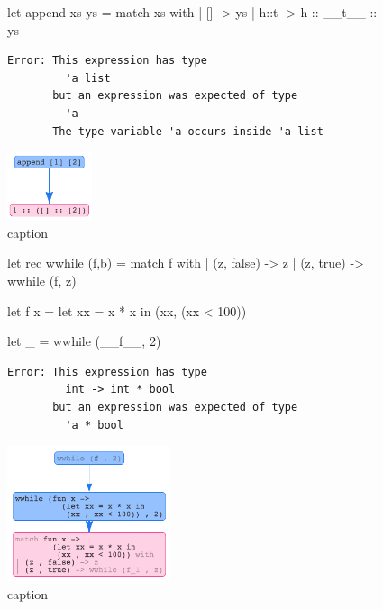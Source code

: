 \begin{figure}[ht]
\centering
\begin{minipage}{0.49\linewidth}
\centering
\begin{ecode}
let append xs ys = match xs with
  | []   -> ys
  | h::t -> h :: __t__ :: ys
\end{ecode}
\begin{verbatim}
Error: This expression has type
         'a list
       but an expression was expected of type
         'a
       The type variable 'a occurs inside 'a list
\end{verbatim}
\end{minipage}
\begin{minipage}{0.49\linewidth}
\centering
\includegraphics[height=75px]{append.png}
\end{minipage}
\caption{caption}
\label{fig:traces}
\end{figure}

\begin{figure}[ht]
\centering
\begin{minipage}{0.49\linewidth}
\centering
\begin{ecode}
let rec wwhile (f,b) =
  match f with
  | (z, false) -> z
  | (z, true)  -> wwhile (f, z)

let f x =
  let xx = x * x in
  (xx, (xx < 100))

let _ = wwhile (__f__, 2)
\end{ecode}
\begin{verbatim}
Error: This expression has type
         int -> int * bool
       but an expression was expected of type
         'a * bool
\end{verbatim}
\end{minipage}
\begin{minipage}{0.49\linewidth}
\centering
\includegraphics[height=150px]{wwhile.png}
\end{minipage}
\caption{caption}
\label{fig:traces}
\end{figure}














